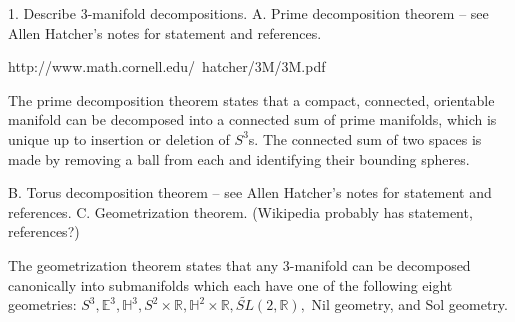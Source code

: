 \documentclass[12pt]{amsart}
\newcommand{\ignore}[1]{}
\begin{document}
1.  Describe 3-manifold decompositions.
  A.  Prime decomposition theorem -- see Allen Hatcher's notes for statement and references.

\cite{Milnor}

\cite{Kneser}



http://www.math.cornell.edu/~hatcher/3M/3M.pdf

\ignore{@Misc{•,
OPTkey = {•},
OPTauthor = {Allen Hatcher},
OPTtitle = {Notes on Basic 3-Manifold Topology},
OPThowpublished = {•},
OPTmonth = {•},
OPTyear = {•},
OPTnote = {•},
OPTannote = {•}
}

@Article{Milnor,
author = {J. Milnor},
title = {A Unique Decomposition Theorem for 3-Manifolds},
journal = {American Journal of Mathematics},
year = {1962},
OPTvolume = {84},
OPTnumber = {1},
OPTpages = {1-7},
OPTmonth = {January}
}



@Article{Kneser,
author = {H. Kneser},
title = {Geschlossen Fl\"achen in dreidimensionalen Mannigfaltigkeiten},
journal = {Jahresbericht der Deutschen Mathematiker Vereinigung},
year = {1929},
OPTvolume = {38},
OPTpages = {248-260}
}}

The prime decomposition theorem states that a compact, connected, orientable manifold can be decomposed into a connected sum of prime manifolds, which is unique up to insertion or deletion of $S^3$s. The connected sum of two spaces is made by removing a ball from each and identifying their bounding spheres.
  
  B.  Torus decomposition theorem -- see Allen Hatcher's notes for statement and references.
  C.  Geometrization theorem.  (Wikipedia probably has statement, references?)

The geometrization theorem states that any 3-manifold can be decomposed canonically into submanifolds which each have one of the following eight geometries: $S^3, \mathbb{E}^3, \mathbb{H}^3, S^2 \times \mathbb{R}, \mathbb{H}^2 \times \mathbb{R}, \tilde{SL}(2,\mathbb{R}),$ Nil geometry, and Sol geometry.

\end{document}

